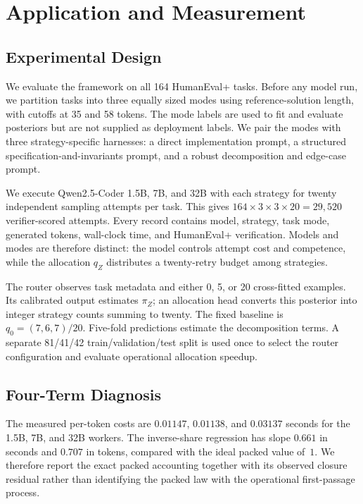 \section{Application and Measurement}
\label{sec:application}
\label{sec:measurement}

\subsection{Experimental Design}

We evaluate the framework on all 164 HumanEval+ tasks.  Before any model run,
we partition tasks into three equally sized modes using reference-solution
length, with cutoffs at 35 and 58 tokens.  The mode labels are used to fit and
evaluate posteriors but are not supplied as deployment labels.  We pair the
modes with three strategy-specific harnesses: a direct implementation prompt,
a structured specification-and-invariants prompt, and a robust decomposition
and edge-case prompt.

We execute Qwen2.5-Coder 1.5B, 7B, and 32B with each strategy for twenty
independent sampling attempts per task.  This gives
$164\times3\times3\times20=29{,}520$ verifier-scored attempts.  Every record
contains model, strategy, task mode, generated tokens, wall-clock time, and
HumanEval+ verification.  Models and modes are therefore distinct: the model
controls attempt cost and competence, while the allocation $q_Z$ distributes a
twenty-retry budget among strategies.

The router observes task metadata and either 0, 5, or 20 cross-fitted examples.
Its calibrated output estimates $\pi_Z$; an allocation head converts this
posterior into integer strategy counts summing to twenty.  The fixed baseline
is $q_0=(7,6,7)/20$.  Five-fold predictions estimate the decomposition terms.
A separate 81/41/42 train/validation/test split is used once to select the
router configuration and evaluate operational allocation speedup.

\subsection{Four-Term Diagnosis}

The measured per-token costs are $0.01147$, $0.01138$, and $0.03137$ seconds
for the 1.5B, 7B, and 32B workers.  The inverse-share regression has slope
$0.661$ in seconds and $0.707$ in tokens, compared with the ideal packed value
of~$1$.  We therefore report the exact packed accounting together with its
observed closure residual rather than identifying the packed law with the
operational first-passage process.

